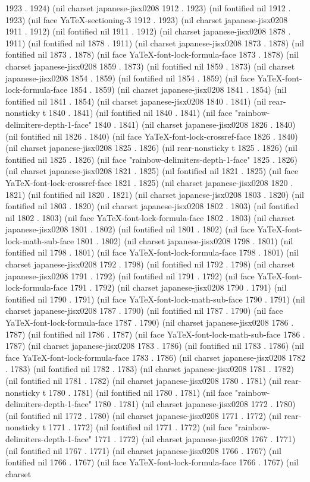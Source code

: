 1923 . 1924) (nil charset japanese-jisx0208 1912 . 1923) (nil fontified nil 1912 . 1923) (nil face YaTeX-sectioning-3 1912 . 1923) (nil charset japanese-jisx0208 1911 . 1912) (nil fontified nil 1911 . 1912) (nil charset japanese-jisx0208 1878 . 1911) (nil fontified nil 1878 . 1911) (nil charset japanese-jisx0208 1873 . 1878) (nil fontified nil 1873 . 1878) (nil face YaTeX-font-lock-formula-face 1873 . 1878) (nil charset japanese-jisx0208 1859 . 1873) (nil fontified nil 1859 . 1873) (nil charset japanese-jisx0208 1854 . 1859) (nil fontified nil 1854 . 1859) (nil face YaTeX-font-lock-formula-face 1854 . 1859) (nil charset japanese-jisx0208 1841 . 1854) (nil fontified nil 1841 . 1854) (nil charset japanese-jisx0208 1840 . 1841) (nil rear-nonsticky t 1840 . 1841) (nil fontified nil 1840 . 1841) (nil face "rainbow-delimiters-depth-1-face" 1840 . 1841) (nil charset japanese-jisx0208 1826 . 1840) (nil fontified nil 1826 . 1840) (nil face YaTeX-font-lock-crossref-face 1826 . 1840) (nil charset japanese-jisx0208 1825 . 1826) (nil rear-nonsticky t 1825 . 1826) (nil fontified nil 1825 . 1826) (nil face "rainbow-delimiters-depth-1-face" 1825 . 1826) (nil charset japanese-jisx0208 1821 . 1825) (nil fontified nil 1821 . 1825) (nil face YaTeX-font-lock-crossref-face 1821 . 1825) (nil charset japanese-jisx0208 1820 . 1821) (nil fontified nil 1820 . 1821) (nil charset japanese-jisx0208 1803 . 1820) (nil fontified nil 1803 . 1820) (nil charset japanese-jisx0208 1802 . 1803) (nil fontified nil 1802 . 1803) (nil face YaTeX-font-lock-formula-face 1802 . 1803) (nil charset japanese-jisx0208 1801 . 1802) (nil fontified nil 1801 . 1802) (nil face YaTeX-font-lock-math-sub-face 1801 . 1802) (nil charset japanese-jisx0208 1798 . 1801) (nil fontified nil 1798 . 1801) (nil face YaTeX-font-lock-formula-face 1798 . 1801) (nil charset japanese-jisx0208 1792 . 1798) (nil fontified nil 1792 . 1798) (nil charset japanese-jisx0208 1791 . 1792) (nil fontified nil 1791 . 1792) (nil face YaTeX-font-lock-formula-face 1791 . 1792) (nil charset japanese-jisx0208 1790 . 1791) (nil fontified nil 1790 . 1791) (nil face YaTeX-font-lock-math-sub-face 1790 . 1791) (nil charset japanese-jisx0208 1787 . 1790) (nil fontified nil 1787 . 1790) (nil face YaTeX-font-lock-formula-face 1787 . 1790) (nil charset japanese-jisx0208 1786 . 1787) (nil fontified nil 1786 . 1787) (nil face YaTeX-font-lock-math-sub-face 1786 . 1787) (nil charset japanese-jisx0208 1783 . 1786) (nil fontified nil 1783 . 1786) (nil face YaTeX-font-lock-formula-face 1783 . 1786) (nil charset japanese-jisx0208 1782 . 1783) (nil fontified nil 1782 . 1783) (nil charset japanese-jisx0208 1781 . 1782) (nil fontified nil 1781 . 1782) (nil charset japanese-jisx0208 1780 . 1781) (nil rear-nonsticky t 1780 . 1781) (nil fontified nil 1780 . 1781) (nil face "rainbow-delimiters-depth-1-face" 1780 . 1781) (nil charset japanese-jisx0208 1772 . 1780) (nil fontified nil 1772 . 1780) (nil charset japanese-jisx0208 1771 . 1772) (nil rear-nonsticky t 1771 . 1772) (nil fontified nil 1771 . 1772) (nil face "rainbow-delimiters-depth-1-face" 1771 . 1772) (nil charset japanese-jisx0208 1767 . 1771) (nil fontified nil 1767 . 1771) (nil charset japanese-jisx0208 1766 . 1767) (nil fontified nil 1766 . 1767) (nil face YaTeX-font-lock-formula-face 1766 . 1767) (nil charset 